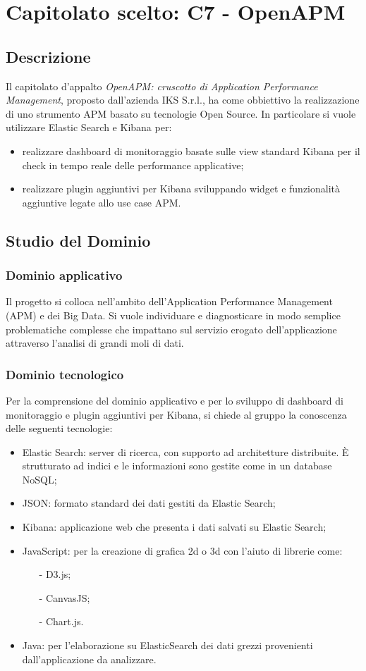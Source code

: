 \newpage
\section{Capitolato scelto: C7 - OpenAPM}
	\subsection{Descrizione}
	Il capitolato d'appalto \emph{OpenAPM: cruscotto di Application Performance Management},  proposto dall'azienda IKS S.r.l., ha come obbiettivo la realizzazione di uno strumento APM basato su tecnologie Open Source. In particolare si vuole utilizzare Elastic Search e Kibana per:
	\begin{itemize}
		\item realizzare dashboard di monitoraggio  basate sulle view standard Kibana per il check in tempo reale delle performance applicative;
		\item realizzare plugin aggiuntivi per Kibana sviluppando widget e funzionalità aggiuntive legate allo use case APM. 
	\end{itemize}
	
	\subsection{Studio del Dominio}
		\subsubsection{Dominio applicativo}
		Il progetto si colloca nell'ambito dell'Application Performance Management (APM) e dei Big Data. Si vuole individuare e diagnosticare in modo semplice problematiche complesse che impattano sul servizio erogato dell'applicazione attraverso l'analisi di grandi moli di dati.
		\subsubsection{Dominio tecnologico}
		Per la comprensione del dominio applicativo e per lo sviluppo di dashboard di monitoraggio e plugin aggiuntivi per Kibana, si chiede al gruppo la conoscenza delle seguenti tecnologie:
		\begin{itemize}
			\item Elastic Search: server di ricerca, con supporto ad architetture distribuite. \MakeUppercase{è} strutturato ad indici e le informazioni sono gestite come in un database NoSQL;
			\item JSON: formato standard dei dati gestiti da Elastic Search;
			\item Kibana: applicazione web che presenta i dati salvati su Elastic Search;
			\item JavaScript: per la creazione di grafica 2d o 3d con l'aiuto di librerie come:
			\begin{itemize}
				\item[-] D3.js;
				\item[-] CanvasJS;
				\item[-] Chart.js.
			\end{itemize}
			\item Java: per l'elaborazione su ElasticSearch dei dati grezzi provenienti dall'applicazione da analizzare.
		\end{itemize}

